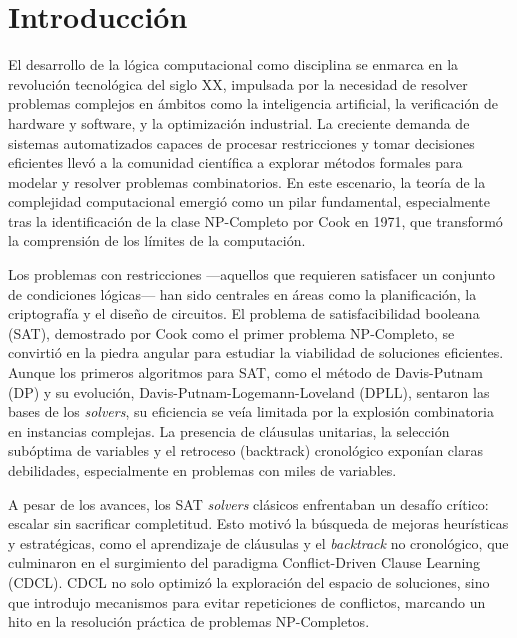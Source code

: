 \chapter*{Introducción}\label{chapter:introduction}
El desarrollo de la lógica computacional como disciplina se enmarca en la revolución tecnológica del siglo XX, impulsada por la necesidad de resolver problemas complejos en ámbitos como la inteligencia artificial, la verificación de hardware y software, y la optimización industrial. La creciente demanda de sistemas automatizados capaces de procesar restricciones y tomar decisiones eficientes llevó a la comunidad científica a explorar métodos formales para modelar y resolver problemas combinatorios. En este escenario, la teoría de la complejidad computacional emergió como un pilar fundamental, especialmente tras la identificación de la clase NP-Completo por Cook en 1971, que transformó la comprensión de los límites de la computación.

Los problemas con restricciones —aquellos que requieren satisfacer un conjunto de condiciones lógicas— han sido centrales en áreas como la planificación, la criptografía y el diseño de circuitos. El problema de satisfacibilidad booleana (SAT), demostrado por Cook como el primer problema NP-Completo, se convirtió en la piedra angular para estudiar la viabilidad de soluciones eficientes. Aunque los primeros algoritmos para SAT, como el método de Davis-Putnam (DP) y su evolución, Davis-Putnam-Logemann-Loveland (DPLL), sentaron las bases de los \textit{solvers}, su eficiencia se veía limitada por la explosión combinatoria en instancias complejas. La presencia de cláusulas unitarias, la selección subóptima de variables y el retroceso (backtrack) cronológico exponían claras debilidades, especialmente en problemas con miles de variables.

A pesar de los avances, los SAT \textit{solvers} clásicos enfrentaban un desafío crítico: escalar sin sacrificar completitud. Esto motivó la búsqueda de mejoras heurísticas y estratégicas, como el aprendizaje de cláusulas y el \textit{backtrack} no cronológico, que culminaron en el surgimiento del paradigma Conflict-Driven Clause Learning (CDCL). CDCL no solo optimizó la exploración del espacio de soluciones, sino que introdujo mecanismos para evitar repeticiones de conflictos, marcando un hito en la resolución práctica de problemas NP-Completos. 


